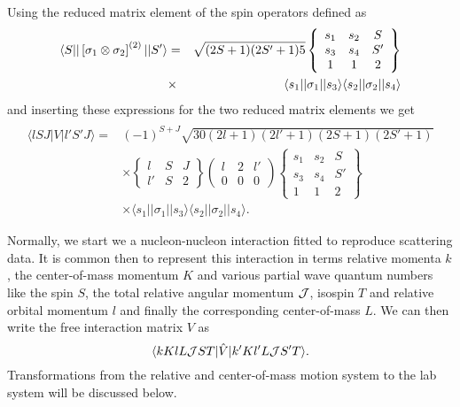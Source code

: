 \documentclass[graybox,sectrefs,envcountresetchap,open=right]{svmonodo}
\begin{document}
Using the  reduced matrix element of the spin 
operators defined as
\begin{eqnarray*}
\langle S\vert \vert\left[{\bf \sigma}_1 \otimes {\bf \sigma}_2\right]^{(2)} \vert \vert S' \rangle
& = & 
\sqrt{(2S+1)(2S'+1)5}
\left\{\begin{array}{ccc} s_1&s_2&S \\s_3&s_4&S' \\ 1&1&2\end{array}\right\}\\
&\times& 
\langle s_1 \vert \vert {\bf \sigma}_1 \vert \vert s_3\rangle
\langle s_2 \vert\vert {\bf \sigma}_2 \vert \vert s_4\rangle
\end{eqnarray*}
and inserting  these expressions for the two reduced matrix elements we get 
\[
\begin{array}{ll}
&\\
\langle lSJ\vert V\vert l'S'J\rangle =&(-1)^{S+J}\sqrt{30(2l+1)(2l'+1)(2S+1)(2S'+1)}\\
&\times\left\{\begin{array}{ccc}l&S &J \\l'&S&2\end{array}\right\}
\left(\begin{array}{ccc}l&2&l'\\0&0&0\end{array}\right)
\left\{\begin{array}{ccc}s_{1}&s_{2}&S\\s_{3}&s_{4}&S'\\
1&1&2\end{array}
\right\}\\
&\times\langle s_{1}\vert\vert \sigma_{1}\vert\vert s_{3}\rangle
\langle s_{2}\vert\vert \sigma_{2}\vert \vert s_{4}\rangle.
\end{array}
\]



Normally, we start we a nucleon-nucleon interaction fitted to reproduce scattering data.
It is common then to represent this interaction in terms relative momenta $k$, the center-of-mass momentum $K$
and various partial wave quantum numbers like the spin $S$, the total relative angular  momentum ${\cal J}$, isospin $T$ and relative orbital momentum $l$ and finally the corresponding center-of-mass $L$.  
We can then write the  free interaction matrix $V$ as
\[
    \langle kKlL{\cal J}ST\vert\hat{V}\vert k'Kl'L{\cal J}S'T\rangle.
\]
Transformations from the relative and center-of-mass motion
system to the lab system will be discussed
below.
\end{document}
